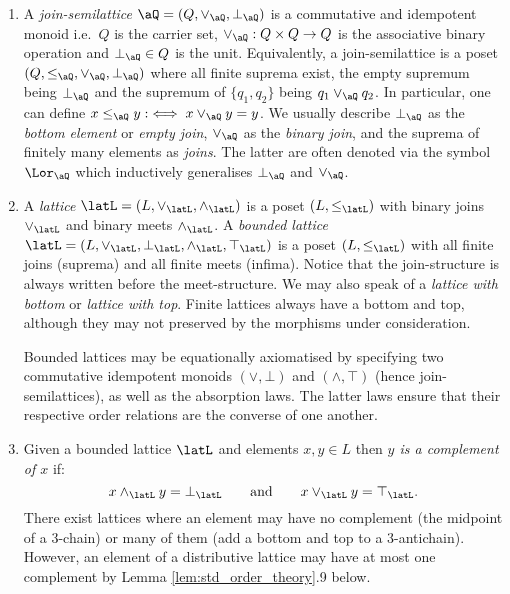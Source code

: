 \documentclass{article}
\begin{document}
\begin{definition}
\begin{enumerate}
\item
A \emph{join-semilattice} $\aQ = (Q,\lor_\aQ,\bot_\aQ)$ is a commutative and idempotent monoid i.e.\ $Q$ is the carrier set, $\lor_\aQ : Q \times Q \to Q$  is the associative binary operation and $\bot_\aQ \in Q$ is the unit. Equivalently, a join-semilattice is a poset $(Q,\leq_\aQ,\lor_\aQ,\bot_\aQ)$ where all finite suprema exist, the empty supremum being $\bot_\aQ$ and the supremum of $\{q_1,q_2\}$ being $q_1 \lor_\aQ q_2$. In particular, one can define $x \leq_\aQ y :\iff x \lor_\aQ y = y$. We usually describe $\bot_\aQ$ as the \emph{bottom element} or \emph{empty join}, $\lor_\aQ$ as the \emph{binary join}, and the suprema of finitely many elements as \emph{joins}. The latter are often denoted via the symbol $\Lor_\aQ$ which inductively generalises $\bot_\aQ$ and $\lor_\aQ$.

\item
A \emph{lattice} $\latL = (L,\lor_\latL,\land_\latL)$ is a poset $(L,\leq_\latL)$ with  binary joins $\lor_\latL$ and binary meets $\land_\latL$. A \emph{bounded lattice} $\latL = (L,\lor_\latL,\bot_\latL,\land_\latL,\top_\latL)$ is a poset $(L,\leq_\latL)$ with all finite joins (suprema) and all finite meets (infima). Notice that the join-structure is always written before the meet-structure. We may also speak of a \emph{lattice with bottom} or \emph{lattice with top}. Finite lattices always have a bottom and top, although they may not preserved by the morphisms under consideration.

Bounded lattices may be equationally axiomatised by specifying two commutative idempotent monoids $(\lor,\bot)$ and $(\land,\top)$ (hence join-semilattices), as well as the absorption laws. The latter laws ensure that their respective order relations are the converse of one another.


\item
Given a bounded lattice $\latL$ and elements $x,y \in L$ then \emph{$y$ is a complement of $x$} if:
\[
x \land_\latL y = \bot_{\latL}
\qquad\text{and}\qquad
x \lor_\latL y = \top_{\latL}.
\]
There exist lattices where an element may have no complement (the midpoint of a $3$-chain) or many of them (add a bottom and top to a $3$-antichain). However, an element of a distributive lattice may have at most one complement by Lemma \ref{lem:std_order_theory}.9 below.



\end{enumerate}
\end{definition}
\end{document}
